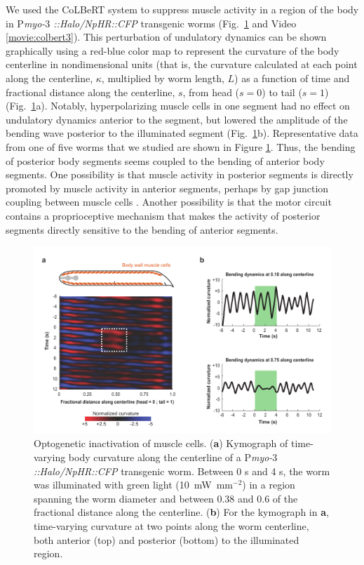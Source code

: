 We used the CoLBeRT system to suppress muscle activity in a region of the body in P\textit{myo-$3$ ::Halo/NpHR::CFP} transgenic worms (Fig.~\ref{fig:colbert2} and Video \ref{movie:colbert3}). This perturbation of undulatory dynamics can be shown graphically using a red-blue color map to represent the curvature of the body centerline in nondimensional units (that is, the curvature calculated at each point along the centerline, $\kappa$, multiplied by worm length, $L$) as a function of time and fractional distance along the centerline, $s$, from head ($s = 0$) to tail ($s = 1$) (Fig.~\ref{fig:colbert2}a). Notably, hyperpolarizing muscle cells in one segment had no effect on undulatory dynamics anterior to the segment, but lowered the amplitude of the bending wave posterior to the illuminated segment (Fig.~\ref{fig:colbert2}b). Representative data from one of five worms that we studied are shown in Figure \ref{fig:colbert2}. Thus, the bending of posterior body segments seems coupled to the bending of anterior body segments. One possibility is that muscle activity in posterior segments is directly promoted by muscle activity in anterior segments, perhaps by gap junction coupling between muscle cells \citep{liu_low_2006}. Another possibility is that the motor circuit contains a proprioceptive mechanism that makes the activity of posterior segments directly sensitive to the bending of anterior segments.

\begin{figure} 
\includegraphics[width=\textwidth]{figures/colbert2}
\caption[Optogenetic inactivation of muscle cells.]{Optogenetic inactivation of muscle cells. (\textbf{a}) Kymograph of time-varying body curvature along the centerline of a P\textit{myo-$3$::Halo/NpHR::CFP} transgenic worm. Between 0 s and 4 s, the worm was illuminated with green light (10~mW~mm$^{-2}$) in a region spanning the worm diameter and between 0.38 and 0.6 of the fractional distance along the centerline. (\textbf{b}) For the kymograph in \textbf{a}, time-varying curvature at two points along the worm centerline, both anterior (top) and posterior (bottom) to the illuminated region. \label{fig:colbert2}}
\end{figure}
\afterpage{\clearpage}

